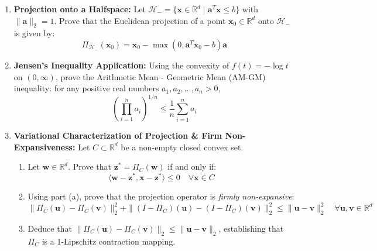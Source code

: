 \begin{enumerate}[label=\textbf{P\arabic*.}]
    \item \textbf{Projection onto a Halfspace:}
    Let $\mathcal{H}_- = \{\mathbf{x} \in \mathbb{R}^d \mid \mathbf{a}^T \mathbf{x} \le b\}$ with $\|\mathbf{a}\|_2 = 1$.
    Prove that the Euclidean projection of a point $\mathbf{x}_0 \in \mathbb{R}^d$ onto $\mathcal{H}_-$ is given by:
    \begin{equation}
    \Pi_{\mathcal{H}_-}(\mathbf{x}_0) = \mathbf{x}_0 - \max(0, \mathbf{a}^T \mathbf{x}_0 - b) \mathbf{a}
    \end{equation}

    \item \textbf{Jensen's Inequality Application:}
    Using the convexity of $f(t) = -\log t$ on $(0, \infty)$, prove the Arithmetic Mean - Geometric Mean (AM-GM) inequality: for any positive real numbers $a_1, a_2, \dots, a_n > 0$,
    \begin{equation}
    \left( \prod_{i=1}^n a_i \right)^{1/n} \le \frac{1}{n} \sum_{i=1}^n a_i
    \end{equation}

    \item \textbf{Variational Characterization of Projection \& Firm Non-Expansiveness:}
    Let $C \subset \mathbb{R}^d$ be a non-empty closed convex set.
    \begin{enumerate}[label=(\alph*)]
        \item Let $\mathbf{w} \in \mathbb{R}^d$. Prove that $\mathbf{z}^* = \Pi_C(\mathbf{w})$ if and only if:
        \begin{equation*}
        \langle \mathbf{w} - \mathbf{z}^*, \mathbf{x} - \mathbf{z}^* \rangle \le 0 \quad \forall \mathbf{x} \in C
        \end{equation*}
        \item Using part (a), prove that the projection operator is \emph{firmly non-expansive}:
        \begin{equation*}
        \|\Pi_C(\mathbf{u}) - \Pi_C(\mathbf{v})\|_2^2 + \|(I - \Pi_C)(\mathbf{u}) - (I - \Pi_C)(\mathbf{v})\|_2^2 \le \|\mathbf{u} - \mathbf{v}\|_2^2 \quad \forall \mathbf{u}, \mathbf{v} \in \mathbb{R}^d
        \end{equation*}
        \item Deduce that $\|\Pi_C(\mathbf{u}) - \Pi_C(\mathbf{v})\|_2 \le \|\mathbf{u} - \mathbf{v}\|_2$, establishing that $\Pi_C$ is a 1-Lipschitz contraction mapping.
    \end{enumerate}


\end{enumerate}
